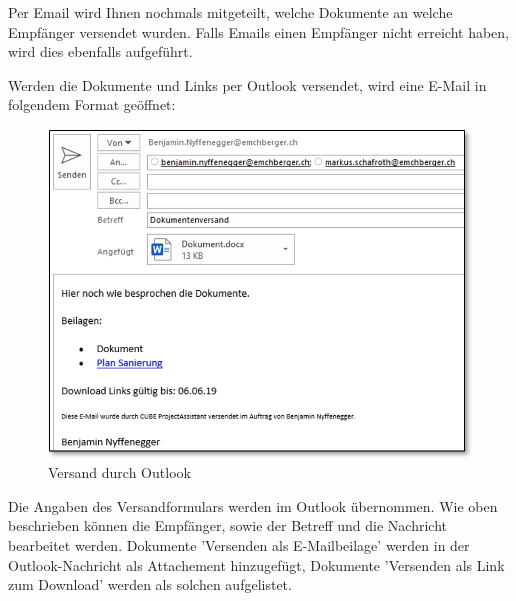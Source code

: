 Per Email wird Ihnen nochmals mitgeteilt, welche Dokumente an welche Empfänger versendet wurden. Falls Emails einen Empfänger nicht erreicht haben, wird dies ebenfalls aufgeführt.

\vspace{\baselineskip}

Werden die Dokumente und Links per Outlook versendet, wird eine E-Mail in folgendem Format geöffnet:
 
\begin{figure}   %
  \vspace{-30pt}      %
  \begin{center}
    \includegraphics[width=1\linewidth]{../chapters/11_Dokumentenablage/pictures/11-dkorb_Dok_Outlook.jpg}
  \end{center}
  \vspace{-20pt}
  \caption{Versand durch Outlook}
  \vspace{-10pt}
\end{figure}

Die Angaben des Versandformulars werden im Outlook übernommen. Wie oben beschrieben können die Empfänger, sowie der Betreff und die Nachricht bearbeitet werden. Dokumente 'Versenden als E-Mailbeilage' werden in der Outlook-Nachricht als Attachement hinzugefügt, Dokumente 'Versenden als Link zum Download' werden als solchen aufgelistet. 

\vspace{1cm}

